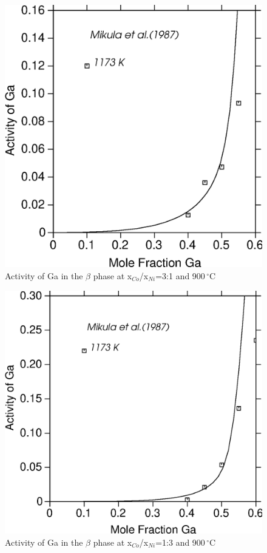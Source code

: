 \documentclass[article]{elsarticle}
\begin{document}
\begin{figure}
\centering
\includegraphics[scale=0.45]{acr_beta_Co75}
\caption{Activity of Ga in the $\beta$ phase at x$_{Co}$/x$_{Ni}$=3:1 and 900$\,^{\circ}\mathrm{C}$}
\label{acr_co75}
\end{figure}
\begin{figure}
\centering
\includegraphics[scale=0.45]{acr_beta_Co25}
\caption{Activity of Ga in the $\beta$ phase at x$_{Co}$/x$_{Ni}$=1:3 and 900$\,^{\circ}\mathrm{C}$}
\label{acr_co25}
\end{figure}
\end{document}
